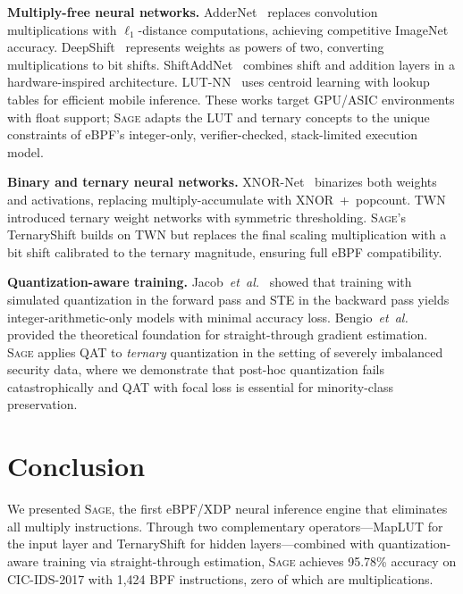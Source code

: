 \documentclass[sigconf,nonacm]{acmart}
\newcommand{\sys}{\textsc{Sage}\xspace}
\newcommand{\etal}{\textit{et~al.}\xspace}
\begin{document}
\textbf{Multiply-free neural networks.}
AdderNet~\cite{chen2020addernet} replaces convolution multiplications
with $\ell_1$-distance computations, achieving competitive ImageNet
accuracy.
DeepShift~\cite{elhoushi2021deepshift} represents weights as powers of
two, converting multiplications to bit shifts.
ShiftAddNet~\cite{you2020shiftaddnet} combines shift and addition
layers in a hardware-inspired architecture.
LUT-NN~\cite{park2024lutnn} uses centroid learning with lookup tables
for efficient mobile inference.
These works target GPU/ASIC environments with float support;
\sys adapts the LUT and ternary concepts to the unique constraints of
eBPF's integer-only, verifier-checked, stack-limited execution model.

\textbf{Binary and ternary neural networks.}
XNOR-Net~\cite{rastegari2016xnor} binarizes both weights and
activations, replacing multiply-accumulate with XNOR~+~popcount.
TWN~\cite{li2016twn} introduced ternary weight networks with symmetric
thresholding.
\sys's TernaryShift builds on TWN but replaces the final scaling
multiplication with a bit shift calibrated to the ternary magnitude,
ensuring full eBPF compatibility.

\textbf{Quantization-aware training.}
Jacob~\etal~\cite{jacob2018quant} showed that training with simulated
quantization in the forward pass and STE in the backward pass yields
integer-arithmetic-only models with minimal accuracy loss.
Bengio~\etal~\cite{bengio2013ste} provided the theoretical foundation
for straight-through gradient estimation.
\sys applies QAT to \emph{ternary} quantization in the setting of
severely imbalanced security data, where we demonstrate that post-hoc
quantization fails catastrophically and QAT with focal loss is
essential for minority-class preservation.


\section{Conclusion}\label{sec:conclusion}

We presented \sys, the first eBPF/XDP neural inference engine that
eliminates all multiply instructions.
Through two complementary operators---MapLUT for the input layer and
TernaryShift for hidden layers---combined with quantization-aware
training via straight-through estimation, \sys achieves 95.78\% accuracy
on CIC-IDS-2017 with 1{,}424 BPF instructions, zero of which are
multiplications.
\end{document}
